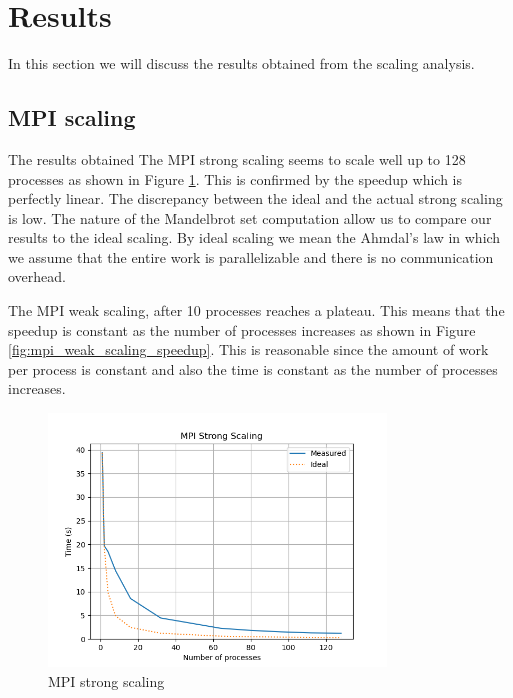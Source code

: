 \section{Results}

In this section we will discuss the results obtained from the scaling analysis.

\subsection{MPI scaling}

The results obtained The MPI strong scaling seems to scale well up to 128 processes as shown in Figure \ref{fig:mpi_strong_scaling}. This is confirmed by the speedup which is perfectly linear. The discrepancy between the ideal and the actual strong scaling is low. The nature of the Mandelbrot set computation allow us to compare our results to the ideal scaling. By ideal scaling we mean the Ahmdal's law in which we assume that the entire work is parallelizable and there is no communication overhead. 

The MPI weak scaling, after 10 processes reaches a plateau. This means that the speedup is constant as the number of processes increases as shown in Figure \ref{fig:mpi_weak_scaling_speedup}. This is reasonable since the amount of work per process is constant and also the time is constant as the number of processes increases.

\begin{figure}[h!]
    \centering
    \includegraphics[width=0.8\textwidth]{../images/mpi_strong_scaling.png}
    \caption{MPI strong scaling}
    \label{fig:mpi_strong_scaling}
\end{figure}

